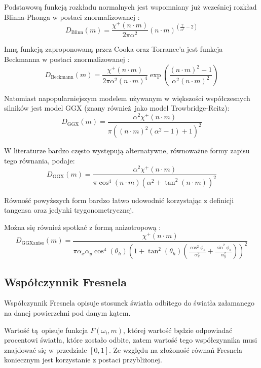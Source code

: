 \documentclass[../main.tex]{subfiles}
\begin{document}
Podstawową funkcją rozkładu normalnych jest wspomniany już wcześniej rozkład
Blinna-Phonga w postaci znormalizowanej \cite{SpecularBRDFReference}:
\[
  D_{\text{Blinn}}(m) =
    \frac{\chi^{+}(n \cdot m)}{2\pi\alpha^2}
    (n \cdot m)^{(\frac{2}{\alpha^2} - 2)}
\]

Inną funkcją zaproponowaną przez Cooka oraz Torrance'a jest funkcja Beckmanna \cite{CookTorrance} w postaci znormalizowanej \cite{pbr_background}:
\[
  D_{\text{Beckmann}}(m) =
    \frac{\chi^{+}(n \cdot m)}{2\pi\alpha^2 (n \cdot m)^{4}}
    \exp\left(
      \frac{
        (n \cdot m)^2 - 1
      }{
        \alpha^2 (n \cdot m)^2
      }
    \right)
\]

Natomiast napopularniejszym modelem używanym w większości współczesnych silników jest model GGX (znany również jako model Trowbridge-Reitz):
\[
  D_{\text{GGX}}(m) =
    \frac{
      \alpha^2 \chi^{+}(n \cdot m)
    }{
      \pi \left(
        \left(n \cdot m \right)^{2}
        \left(\alpha^2 - 1 \right)
        + 1
      \right)^2
    }
\]

W literaturze bardzo często występują alternatywne, równoważne formy zapisu
tego równania, \cite{WalterMicrofacetModels} podaje:
\[
  D_{\text{GGX}}(m) =
    \frac{\alpha^2 \chi^{+}(n \cdot m)}{
      \pi \cos^{4} (n \cdot m) \left( \alpha^2 + \tan^2 (n \cdot m) \right)^2
    }
\]

\noindent Równość powyższych form bardzo łatwo udowodnić korzystając z
definicji tangensa oraz jedynki trygonometrycznej.

Można się również spotkać z formą anizotropową \cite{pbrt}:
\[
  D_{\text{GGXaniso}}(m) =
    \frac{\chi^{+}(n \cdot m)}{
      \pi \alpha_x \alpha_y \cos^{4} (\theta_h) \left(
        1 + \tan^{2}(\theta_h) \left(
          \frac{\cos^{2}{\phi_h}}{\alpha_{x}^{2}} +
          \frac{\sin^{2}{\phi_h}}{\alpha_{y}^{2}}
        \right)
      \right)^{2}
    }
\]

\subsection{Współczynnik Fresnela}

Współczynnik Fresnela opisuje stosunek światła odbitego do światła załamanego
na danej powierzchni pod danym kątem.

Wartość tą opisuje funkcja $F(\omega_i,m)$, której wartość będzie odpowiadać
procentowi światła, które zostało odbite, zatem wartość tego współczynnika musi
znajdować się w przedziale $[0,1]$. Ze względu na złożoność równań Fresnela
koniecznym jest korzystanie z postaci przybliżonej. 
\end{document}
